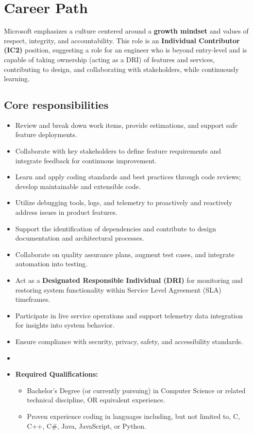 \documentclass[11pt]{article}
\begin{document}
\section*{Career Path}
Microsoft emphasizes a culture centered around a \textbf{growth mindset} 
and values of respect, integrity, and accountability. This role is an 
\textbf{Individual Contributor (IC2)} position, suggesting a role for 
an engineer who is beyond entry-level and is capable of taking ownership 
(acting as a DRI) of features and services, contributing to design, and 
collaborating with stakeholders, while continuously learning.

\newpage
\subsection*{Core responsibilities}
\begin{itemize}
  \item Review and break down work items, provide estimations, and 
    support safe feature deployments.
  \item Collaborate with key stakeholders to define feature requirements 
    and integrate feedback for continuous improvement.
  \item Learn and apply coding standards and best practices through code 
    reviews; develop maintainable and extensible code.
  \item Utilize debugging tools, logs, and telemetry to proactively and 
    reactively address issues in product features.
  \item Support the identification of dependencies and contribute to 
    design documentation and architectural processes.
  \item Collaborate on quality assurance plans, augment test cases, and 
    integrate automation into testing.
  \item Act as a \textbf{Designated Responsible Individual (DRI)} for 
    monitoring and restoring system functionality within Service Level 
    Agreement (SLA) timeframes.
  \item Participate in live service operations and support telemetry data 
    integration for insights into system behavior.
  \item Ensure compliance with security, privacy, safety, and 
    accessibility standards.

  \item \hrulefill
  
  \item \textbf{Required Qualifications:}
  \begin{itemize}
    \item Bachelor's Degree (or currently pursuing) in Computer Science 
      or related technical discipline, OR equivalent experience.
    \item Proven experience coding in languages including, but not limited 
      to, C, C++, C\#, Java, JavaScript, or Python.
  \end{itemize}
  

\end{itemize}
\end{document}
